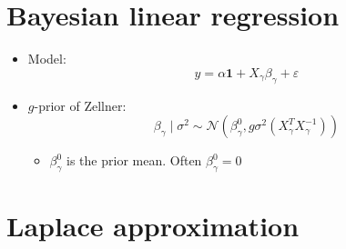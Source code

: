 \documentclass[a4paper]{article}
\begin{document}
\section*{Bayesian linear regression}

\begin{itemize}
    \item Model:
    \[y=\alpha\mathbf{1}+X_{\gamma}\beta_{\gamma}+\varepsilon \]
    \item $g$-prior of Zellner:
    \[\beta_{\gamma}\mid\sigma^2\sim\mathcal{N}\left(\beta_{\gamma}^{0}, g\sigma^2(X_{\gamma}^TX_{\gamma}^{-1})\right) \]
    \begin{itemize}
        \item $\beta_{\gamma}^0$ is the prior mean. Often $\beta_{\gamma}^0=0$
    \end{itemize}
\end{itemize}

\section*{Laplace approximation}
\end{document}
